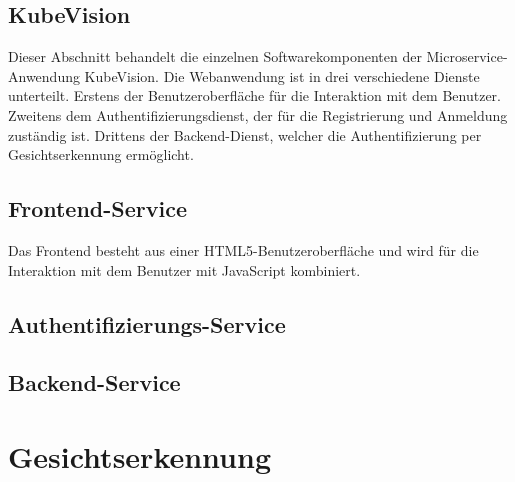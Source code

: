 \subsection{KubeVision}
Dieser Abschnitt behandelt die einzelnen Softwarekomponenten der Microservice-Anwendung KubeVision.
Die Webanwendung ist in drei verschiedene Dienste unterteilt.
Erstens der Benutzeroberfläche für die Interaktion mit dem Benutzer.
Zweitens dem Authentifizierungsdienst, der für die Registrierung und Anmeldung zuständig ist.
Drittens der Backend-Dienst, welcher die Authentifizierung per Gesichtserkennung ermöglicht.

\subsection{Frontend-Service}
Das Frontend besteht aus einer HTML5-Benutzeroberfläche und wird für die Interaktion mit dem Benutzer
mit JavaScript kombiniert.
\subsection{Authentifizierungs-Service}
\subsection{Backend-Service}



\section{Gesichtserkennung}
